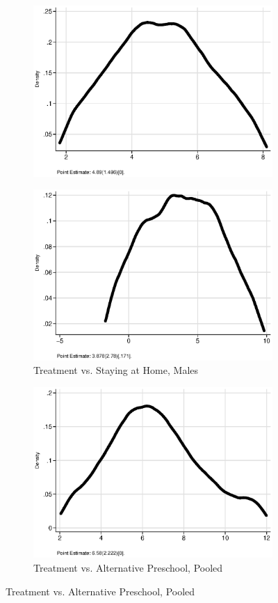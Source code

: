 \begin{figure}
\begin{subfigure}[h]{0.25\textwidth}
		\includegraphics[width=\textwidth]{output/ratios_5_sexf.eps}
\end{subfigure}%
\begin{subfigure}[h]{0.25\textwidth}
	\centering
	\caption{Treatment vs. Staying at Home, Males}
		\includegraphics[width=\textwidth]{output/ratios_5_sexm.eps}
\end{subfigure}
\begin{subfigure}[h]{0.25\textwidth}
	\centering
	\caption{Treatment vs. Alternative Preschool, Pooled}
		\includegraphics[width=\textwidth]{output/ratios_8_sexp.eps}

\end{subfigure}
\end{figure}
